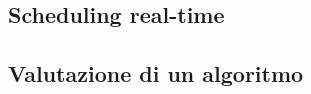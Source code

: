 \subsubsection{}




















\subsection{Scheduling real-time}
\subsection{Valutazione di un algoritmo}

